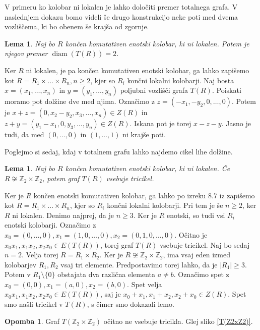 \documentclass[a4paper, 12pt]{amsart}
\theoremstyle{definition} %
\newtheorem{opomba}[definicija]{Opomba}
\theoremstyle{plain} %
\newtheorem{lema}[definicija]{Lema}
\newcommand{\Z}{\mathbb Z}
\DeclareMathOperator{\diam}{diam}
\begin{document}
\endproof

V primeru ko kolobar ni lokalen je lahko določiti premer totalnega grafa. V naslednjem dokazu bomo videli še drugo konstrukcijo neke poti med dvema vozliščema, ki bo obenem še krajša od zgornje.

\begin{lema}
Naj bo $R$ končen komutativen enotski kolobar, ki ni lokalen. Potem je njegov premer $\diam(T(R)) = 2$. 
\end{lema}

\proof
Ker $R$ ni lokalen, je pa končen komutativen enotski kolobar, ga lahko zapišemo kot $R= R_1 \times \dots \times R_n, n\ge 2$, kjer so $R_i$ končni lokalni kolobarji. Naj bosta $x=(x_1,\dots, x_n)$ in $y=(y_1,\dots,y_n)$ poljubni vozlišči grafa $T(R)$. Poiskati moramo pot dolžine dve med njima. Označimo z $z=(-x_1,-y_2,0,\dots,0)$. Potem je $x+z = (0,x_2 - y_2,x_3,\dots,x_n)\in Z(R)$ in $z+y = (y_1 - x_1,0,y_3,\dots,y_n)\in Z(R)$. Iskana pot je torej $x-z-y$.  Jasno je tudi, da med $(0,\dots,0)$ in $(1,\dots,1)$ ni krajše poti.
\endproof

Poglejmo si sedaj, kdaj v totalnem grafu lahko najdemo cikel lihe dolžine.

\begin{lema}
Naj bo $R$ končen komutativen enotski kolobar, ki ni lokalen. Če $R\not\cong \Z_2 \times \Z_2$, potem graf $T(R)$ vsebuje tricikel.
\end{lema}

\proof 
Ker je $R$ končen enotski komutativen kolobar, ga lahko po izreku 8.7 iz \cite{Atiyah} zapišemo kot $R=R_1 \times \dots\times R_n$, kjer so $R_i$ končni lokalni kolobarji. Pri tem je še $n\ge 2$, ker $R$ ni lokalen. Denimo najprej, da je $n\ge 3$. Ker je $R$ enotski, so tudi vsi $R_i$ enotski kolobarji. Označimo z $x_0 = (0,\dots,0), x_1 = (1,0,\dots,0), x_2 = (0,1,0,\dots,0)$. Očitno je $x_0 x_1, x_1 x_2, x_2 x_0 \in E(T(R))$, torej graf $T(R)$ vsebuje tricikel. Naj bo sedaj $n=2$. Velja torej $R= R_1 \times R_2$. Ker je $R\not \cong\Z_2 \times \Z_2$, ima vsaj eden izmed kolobarjev $R_1, R_2$ vsaj tri elemente. Predpostavimo torej lahko, da je $|R_1| \ge 3$. Potem v $R_1 \setminus\{0 \}$ obstajata dva različna elementa $a\neq b$. Označimo spet z $x_0 = (0,0), x_1 = (a,0), x_2 = (b,0)$. Spet velja $x_0 x_1, x_1 x_2, x_2 x_0 \in E(T(R))$, saj je $x_0 + x_1, x_1 + x_2, x_2 + x_0\in Z(R)$. Spet smo našli tricikel v $T(R)$, s čimer smo dokazali lemo.
\endproof

\begin{opomba}
Graf $T(\Z_2 \times \Z_2)$ očitno ne vsebuje tricikla. Glej sliko \ref{T(Z2xZ2)}.
\end{opomba}
\end{document}
